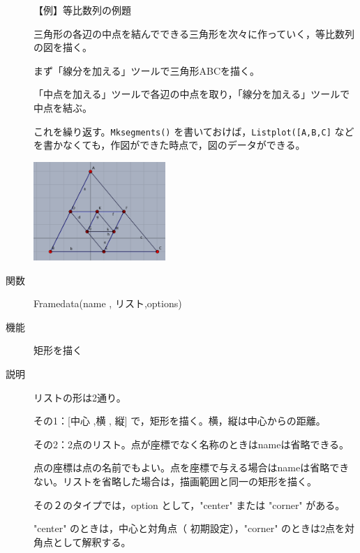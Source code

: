 \documentclass[papersize,a4paper,12pt,uplatex]{jsarticle}
\begin{document}
\begin{description}
\vspace{\baselineskip}
【例】等比数列の例題

三角形の各辺の中点を結んでできる三角形を次々に作っていく，等比数列の図を描く。

まず「線分を加える」ツールで三角形ABCを描く。

「中点を加える」ツールで各辺の中点を取り，「線分を加える」ツールで中点を結ぶ。

これを繰り返す。\verb|Mksegments()| を書いておけば，\verb|Listplot([A,B,C]| などを書かなくても，作図ができた時点で，図のデータができる。

\includegraphics[bb=0.00 0.00 438.02 327.02,width=5cm]{Fig/gpro01.pdf}     

\vspace{\baselineskip}
\hypertarget{framedata}{}
\item[関数]  Framedata(name , リスト,options)
\item[機能]  矩形を描く
\item[説明]  リストの形は2通り。

その1：[中心 ,横 , 縦] で，矩形を描く。横，縦は中心からの距離。

その2：2点のリスト。点が座標でなく名称のときはnameは省略できる。

点の座標は点の名前でもよい。点を座標で与える場合はnameは省略できない。リストを省略した場合は，描画範囲と同一の矩形を描く。

その２のタイプでは，option として，"center" または "corner" がある。

"center" のときは，中心と対角点（ 初期設定），"corner" のときは2点を対角点として解釈する。 


\end{description}
\end{document}
